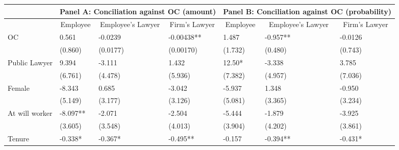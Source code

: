 \begin{tabular}{rrrrrrr}
\toprule
      & \multicolumn{3}{c}{Panel A: Conciliation against OC (amount)} & \multicolumn{3}{c}{Panel B: Conciliation against OC (probability)} \\
\midrule
      & \multicolumn{1}{c}{Employee} & \multicolumn{1}{c}{Employee's Lawyer} & \multicolumn{1}{c}{Firm's Lawyer} & \multicolumn{1}{c}{Employee} & \multicolumn{1}{c}{Employee's Lawyer} & \multicolumn{1}{c}{Firm's Lawyer} \\
      \midrule
\multicolumn{1}{l}{OC} & \multicolumn{1}{l}{0.561} & \multicolumn{1}{l}{-0.0239} & \multicolumn{1}{l}{-0.00438**} & \multicolumn{1}{l}{1.487} & \multicolumn{1}{l}{-0.957**} & \multicolumn{1}{l}{-0.0126} \\
\multicolumn{1}{l}{} & \multicolumn{1}{l}{(0.860)} & \multicolumn{1}{l}{(0.0177)} & \multicolumn{1}{l}{(0.00170)} & \multicolumn{1}{l}{(1.732)} & \multicolumn{1}{l}{(0.480)} & \multicolumn{1}{l}{(0.743)} \\
\multicolumn{1}{l}{Public Lawyer} & \multicolumn{1}{l}{9.394} & \multicolumn{1}{l}{-3.111} & \multicolumn{1}{l}{1.432} & \multicolumn{1}{l}{12.50*} & \multicolumn{1}{l}{-3.338} & \multicolumn{1}{l}{3.785} \\
\multicolumn{1}{l}{} & \multicolumn{1}{l}{(6.761)} & \multicolumn{1}{l}{(4.478)} & \multicolumn{1}{l}{(5.936)} & \multicolumn{1}{l}{(7.382)} & \multicolumn{1}{l}{(4.957)} & \multicolumn{1}{l}{(7.036)} \\
\multicolumn{1}{l}{Female} & \multicolumn{1}{l}{-8.343} & \multicolumn{1}{l}{0.685} & \multicolumn{1}{l}{-3.042} & \multicolumn{1}{l}{-5.937} & \multicolumn{1}{l}{1.348} & \multicolumn{1}{l}{-0.950} \\
\multicolumn{1}{l}{} & \multicolumn{1}{l}{(5.149)} & \multicolumn{1}{l}{(3.177)} & \multicolumn{1}{l}{(3.126)} & \multicolumn{1}{l}{(5.081)} & \multicolumn{1}{l}{(3.365)} & \multicolumn{1}{l}{(3.234)} \\
\multicolumn{1}{l}{At will worker} & \multicolumn{1}{l}{-8.097**} & \multicolumn{1}{l}{-2.071} & \multicolumn{1}{l}{-2.504} & \multicolumn{1}{l}{-5.444} & \multicolumn{1}{l}{-1.879} & \multicolumn{1}{l}{-3.925} \\
\multicolumn{1}{l}{} & \multicolumn{1}{l}{(3.605)} & \multicolumn{1}{l}{(3.548)} & \multicolumn{1}{l}{(4.013)} & \multicolumn{1}{l}{(3.904)} & \multicolumn{1}{l}{(4.202)} & \multicolumn{1}{l}{(3.861)} \\
\multicolumn{1}{l}{Tenure} & \multicolumn{1}{l}{-0.338*} & \multicolumn{1}{l}{-0.367*} & \multicolumn{1}{l}{-0.495**} & \multicolumn{1}{l}{-0.157} & \multicolumn{1}{l}{-0.394**} & \multicolumn{1}{l}{-0.431*} \\

\end{tabular}
